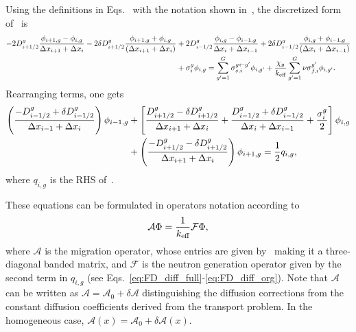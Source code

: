 Using the definitions in Eqs.~ with the notation shown in~, the discretized form of~ is
\begin{equation}\label{eq:FD_diff_full}
\begin{split}
- 2D_{i+1/2}^g\frac{\phi_{i+1,g}-\phi_{i,g}}{\Delta x_{i+1} + \Delta x_i}
- 2\delta D_{i+1/2}^g\frac{\phi_{i+1,g}+\phi_{i,g}}{(\Delta x_{i+1}+\Delta x_i)}
&+ 2D_{i-1/2}^g\frac{\phi_{i,g}-\phi_{i-1,g}}{\Delta x_{i} + \Delta x_{i-1}}  
+ 2\delta D_{i-1/2}^g\frac{\phi_{i,g}+\phi_{i-1,g}}{(\Delta x_i+\Delta x_{i-1})} \\
&+ \sigma_{i}^g \phi_{i,g} 
= \sum\limits_{g'=1}^G \sigma_{s,i}^{g\leftarrow g'}\phi_{i,g'}
+ \frac{\chi_g}{{k_{\textrm{\scriptsize{eff}}}}}\sum\limits_{g'=1}^G
 \nu\sigma_{f,i}^{g'}\phi_{i,g'}.
\end{split}
\end{equation}
Rearranging terms, one gets
\begin{equation}\label{eq:FD_diff_org}
\begin{split}
\left(
\frac{-D_{i-1/2}^g + \delta D_{i-1/2}^g }{\Delta x_{i-1}+\Delta x_{i}}
\right) \phi_{i-1,g}
&+ \left[
\frac{D_{i+1/2}^g - \delta D_{i+1/2}^g}{\Delta x_{i+1}+\Delta x_i}
+\frac{D_{i-1/2}^g + \delta D_{i-1/2}^g}{\Delta x_{i}+\Delta x_{i-1}}
+\frac{\sigma_{i}^g}{2}
\right] \phi_{i,g} \\
&+ \left(
\frac{-D_{i+1/2}^g -\delta D_{i+1/2}^g }{\Delta x_{i+1}+\Delta x_{i}}
\right) \phi_{i+1,g} = \frac{1}{2}q_{i,g},
\end{split}
\end{equation}
where $q_{i,g}$ is the RHS of~.

These equations can be formulated in operators notation according to
\begin{equation}\label{eq:op-not}
\mathcal{A}\Phi=\frac{1}{{k_{\textrm{\scriptsize{eff}}}}}\mathcal{F}\Phi,
\end{equation}
where $\mathcal{A}$ is the migration operator, whose entries are given by~ making it a three-diagonal banded matrix, and $\mathcal{F}$ is the neutron generation operator given by the second term in $q_{i,g}$ (see Eqs.~\ref{eq:FD_diff_full}-\ref{eq:FD_diff_org}). Note that $\mathcal{A}$ can be written as $\mathcal{A}=\mathcal{A}_0+\delta\mathcal{A}$ distinguishing the diffusion corrections from the constant diffusion coefficients derived from the transport problem. In the homogeneous case, $\mathcal{A}(x)=\mathcal{A}_0+\delta\mathcal{A}(x)$.
%
%
